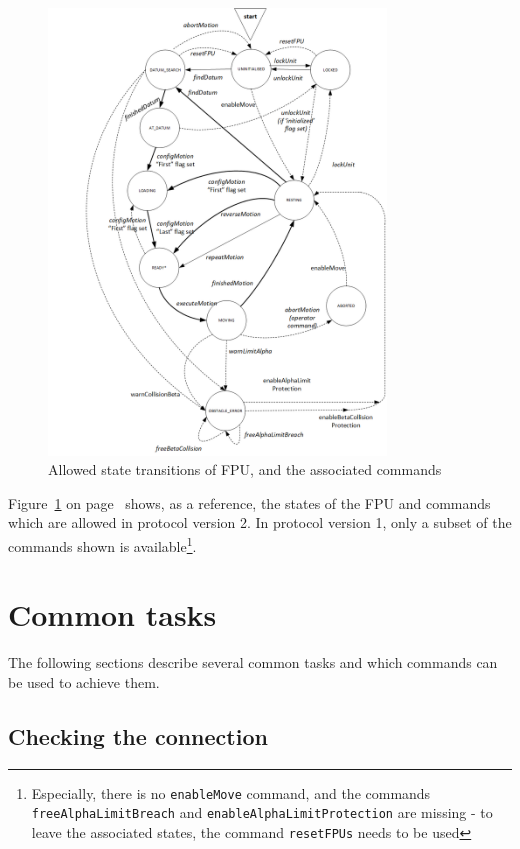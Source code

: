 \documentclass{scrartcl}[12pt,a4paper]
\begin{document}
\begin{figure}

  \includegraphics[width=0.8\textwidth]{FPU-state.png}
  \caption{Allowed state transitions of FPU, and the associated commands}
  \label{fig:states}
\end{figure}

Figure~\ref{fig:states} on page~\pageref{fig:states} shows, as a
reference, the states of the FPU and commands which are allowed in
protocol version 2. In protocol version 1, only a subset of the
commands shown is available\footnote{ Especially, there is no
  \texttt{enableMove} command, and the commands
  \texttt{freeAlphaLimitBreach} and
  \texttt{enableAlphaLimitProtection} are missing - to leave the
  associated states, the command \texttt{resetFPUs} needs to be used}.




\section{Common tasks}

The following sections describe several common tasks
and which commands can be used to achieve them.


\subsection{Checking the connection}
\end{document}
